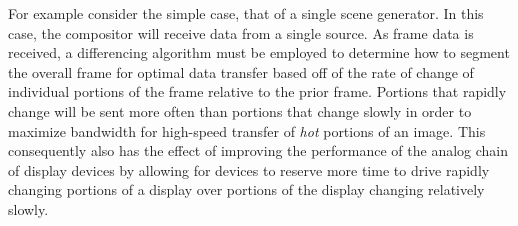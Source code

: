 For example consider the simple case, that of a single scene generator. In this case, the compositor will receive data from a single source. As frame data is received, a differencing algorithm must be employed to determine how to segment the overall frame for optimal data transfer based off of the rate of change of individual portions of the frame relative to the prior frame. Portions that rapidly change will be sent more often than portions that change slowly in order to maximize bandwidth for high-speed transfer of {\it hot} portions of an image. This consequently also has the effect of improving the performance of the analog chain of display devices by allowing for devices to reserve more time to drive rapidly changing portions of a display over portions of the display changing relatively slowly.

